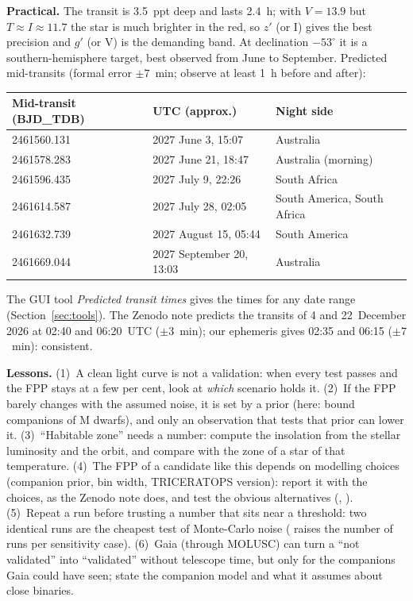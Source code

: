 \textbf{Practical.} The transit is 3.5~ppt deep and lasts 2.4~h; with
$V = 13.9$ but $T \approx I \approx 11.7$ the star is much brighter in the red, so
$z'$ (or I) gives the best precision and $g'$ (or V) is the demanding band.
At declination $-53^\circ$ it is a southern-hemisphere target, best
observed from June to September. Predicted mid-transits (formal error
$\pm7$~min; observe at least 1~h before and after):

\begin{center}
\begin{tabular}{@{}lll@{}}
\toprule
Mid-transit (BJD\_TDB) & UTC (approx.) & Night side\\
\midrule
2461560.131 & 2027 June 3, 15:07 & Australia\\
2461578.283 & 2027 June 21, 18:47 & Australia (morning)\\
2461596.435 & 2027 July 9, 22:26 & South Africa\\
2461614.587 & 2027 July 28, 02:05 & South America, South Africa\\
2461632.739 & 2027 August 15, 05:44 & South America\\
2461669.044 & 2027 September 20, 13:03 & Australia\\
\bottomrule
\end{tabular}
\end{center}

The GUI tool \emph{Predicted transit times} gives the times for any
date range (Section~\ref{sec:tools}). The Zenodo note predicts the
transits of 4 and 22~December 2026 at 02:40 and 06:20~UTC ($\pm3$~min);
our ephemeris gives 02:35 and 06:15 ($\pm7$~min): consistent.

\begin{tip}
\textbf{Lessons.}
(1)~A clean light curve is not a validation: when every test passes and
the FPP stays at a few per cent, look at \emph{which} scenario holds it.
(2)~If the FPP barely changes with the assumed noise, it is set by a prior
(here: bound companions of M dwarfs), and only an observation that tests
that prior can lower it.
(3)~``Habitable zone'' needs a number: compute the insolation from the
stellar luminosity and the orbit, and compare with the zone of a star of
that temperature.
(4)~The FPP of a candidate like this depends on modelling choices
(companion prior, bin width, TRICERATOPS version): report it with the
choices, as the Zenodo note does, and test the obvious alternatives
(, ).
(5)~Repeat a run before trusting a number that sits near a threshold: two
identical runs are the cheapest test of Monte-Carlo noise
( raises the number of runs per sensitivity case).
(6)~Gaia (through MOLUSC) can turn a ``not validated'' into ``validated''
without telescope time, but only for the companions Gaia could have seen;
state the companion model and what it assumes about close binaries.
\end{tip}
